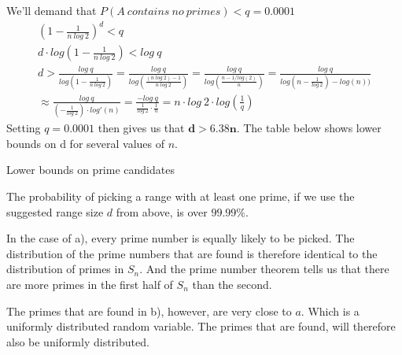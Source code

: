\documentclass[12pt,a4paper]{article}
\begin{document}
\begin{enumerate}[a)]
    We'll demand that \(P(A\ contains\ no\ primes) < q = 0.0001\)
    \begin{gather*}
        \left(1-\frac{1}{n\ log\ 2}\right)^d < q \\
        d \cdot log\left(1-\frac{1}{n\ log\ 2}\right) < log\ q \\
        d > \frac{log\ q}{log\left(1-\frac{1}{n\ log\ 2}\right)} =
        \frac{log\ q}{log\left(\frac{(n\ log\ 2) - 1}{n\ log\ 2}\right)} =
        \frac{log\ q}{log\left(\frac{n - 1/log(2)}{n}\right)} =
        \frac{log\ q}{log(n - \frac{1}{log\ 2}) - log(n))} \\
        \approx \frac{log\ q}{\left(-\frac{1}{log\ 2}\right) \cdot log'(n)} =
        \frac{- log\ q}{\frac{1}{log\ 2} \cdot \frac{1}{n}} =
        n \cdot log\ 2 \cdot log\left( \frac{1}{q} \right)
    \end{gather*}
    Setting \(q = 0.0001\) then gives us that \(\mathbf{d > 6.38n}\).
    The table below shows lower bounds on d for several values of \(n\).
        {\begin{table}[H]
             \centering
             \caption{Lower bounds on prime candidates}
             \label{tab:lower_bounds_for_d}
             
        \end{table}}

    The probability of picking a range with at least one prime, if we use the suggested range size \(d\) from above,
    is over \(\mathbf{99.99\%}\).

    In the case of a), every prime number is equally likely to be picked.
    The distribution of the prime numbers that are found is therefore identical to the distribution of primes in
    \(S_n\).
    And the prime number theorem tells us that there are more primes in the first half of \(S_n\) than the second.

    The primes that are found in b), however, are very close to \(a\).
    Which is a uniformly distributed random variable.
    The primes that are found, will therefore also be uniformly distributed.


\end{enumerate}
\end{document}
